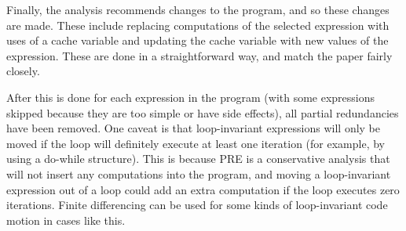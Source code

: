 \documentclass{article}
\begin{document}
Finally, the analysis recommends changes to the program, and so these
changes are made.  These include replacing computations of the selected
expression with uses of a cache variable and updating the cache variable
with new values of the expression.  These are done in a straightforward
way, and match the paper fairly closely.

After this is done for each expression in the program (with some
expressions skipped because they are too simple or have side effects), all
partial redundancies have been removed.  One caveat is that loop-invariant
expressions will only be moved if the loop will definitely execute at least
one iteration (for example, by using a do-while structure).  This is
because PRE is a conservative analysis that will not insert any
computations into the program, and moving a loop-invariant expression out
of a loop could add an extra computation if the loop executes zero
iterations.  Finite differencing can be used for some kinds of
loop-invariant code motion in cases like this.



\end{document}

